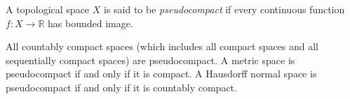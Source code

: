 \documentclass[12pt]{article}
\def\R{\mathbb{R}}
\begin{document}
A topological space $X$ is said to be \emph{pseudocompact} if every continuous function $f\colon X\to\R$ has bounded image.

All countably compact spaces (which includes all compact spaces and all sequentially compact spaces) are pseudocompact.
A metric space is pseudocompact if and only if it is compact.
A Hausdorff normal space is pseudocompact if and only if it is countably compact.

\end{document}
